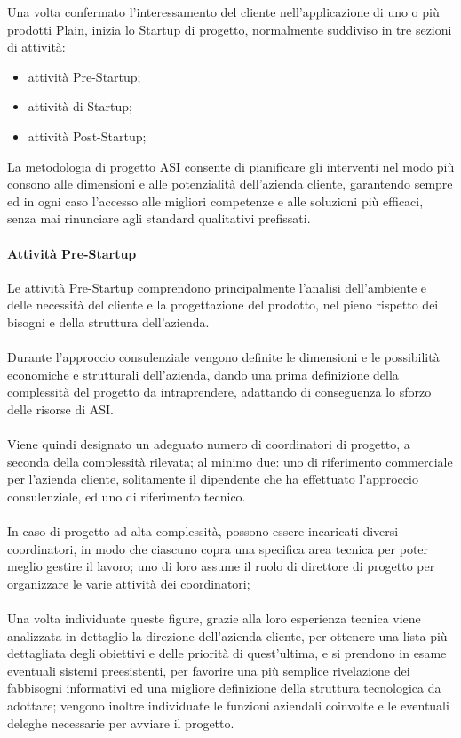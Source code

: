 Una volta confermato l'interessamento del cliente nell'applicazione di uno o più prodotti Plain, inizia lo Startup di progetto, normalmente suddiviso in tre sezioni di attività:
\begin{itemize}
	\item attività Pre-Startup;
	\item attività di Startup;
	\item attività Post-Startup;
\end{itemize}
La metodologia di progetto ASI consente di pianificare gli interventi nel modo più consono alle dimensioni e alle potenzialità dell'azienda cliente, garantendo sempre ed in ogni caso l'accesso alle migliori competenze e alle soluzioni più efficaci, senza mai rinunciare agli standard qualitativi prefissati.
\paragraph{Attività Pre-Startup}
Le attività Pre-Startup comprendono principalmente l'analisi dell'ambiente e delle necessità del cliente e la progettazione del prodotto, nel pieno rispetto dei bisogni e della struttura dell'azienda.
\\\\
Durante l'approccio consulenziale vengono definite le dimensioni e le possibilità economiche e strutturali dell'azienda, dando una prima definizione della complessità del progetto da intraprendere, adattando di conseguenza lo sforzo delle risorse di ASI.
\\\\
Viene quindi designato un adeguato numero di coordinatori di progetto, a seconda della complessità rilevata; al minimo due: uno di riferimento commerciale per l'azienda cliente, solitamente il dipendente che ha effettuato l'approccio consulenziale, ed uno di riferimento tecnico.
\\\\
In caso di progetto ad alta complessità, possono essere incaricati diversi coordinatori, in modo che ciascuno copra una specifica area tecnica per poter meglio gestire il lavoro; uno di loro assume il ruolo di direttore di progetto per organizzare le varie attività dei coordinatori;
\\\\
Una volta individuate queste figure, grazie alla loro esperienza tecnica viene analizzata in dettaglio la direzione dell'azienda cliente, per ottenere una lista più dettagliata degli obiettivi e delle priorità di quest'ultima, e si prendono in esame eventuali sistemi preesistenti, per favorire una più semplice rivelazione dei fabbisogni informativi ed una migliore definizione della struttura tecnologica da adottare; vengono inoltre individuate le funzioni aziendali coinvolte e le eventuali deleghe necessarie per avviare il progetto.

